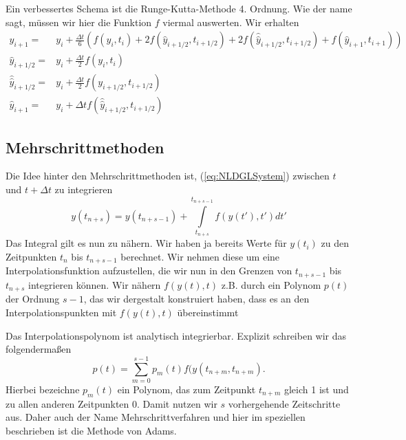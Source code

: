 Ein verbessertes Schema ist die Runge-Kutta-Methode 4. Ordnung. Wie der name
sagt, müssen wir hier die  Funktion $f$ viermal auswerten. Wir erhalten
\begin{align}\label{eq:RK4order}
  y_{i+1} =& y_{i}+\frac{\Delta t}{6}\left( 
    f(y_i,t_i)+2f(\hat{y}_{i+1/2},t_{i+1/2})+2f(\hat{\hat{y}}_{i+1/2},t_{i+1/2})
  +f(\hat{y}_{i+1},t_{i+1})\right)\\
  \hat{y}_{i+1/2}=&y_i+\frac{\Delta t}{2}f(y_{i},t_{i})\nonumber\\
  \hat{\hat{y}}_{i+1/2}=&y_i+\frac{\Delta t}{2}f(y_{i+1/2},t_{i+1/2})\nonumber\\
  \hat{y}_{i+1}=&y_i+\Delta tf(\hat{\hat{y}}_{i+1/2},t_{i+1/2})\nonumber
\end{align}

\subsection{Mehrschrittmethoden}
Die Idee hinter den Mehrschrittmethoden ist, (\ref{eq:NLDGLSystem}) zwischen
$t$ und $t+\Delta t$ zu integrieren
\begin{equation*}
y(t_{n+s})=y(t_{n+s-1})+\int\limits_{t_{n+s}}^{t_{n+s-1}}f(y(t'),t')dt'
\end{equation*}
Das Integral gilt es nun zu nähern. Wir haben ja bereits Werte für $y(t_i)$ zu
den Zeitpunkten $t_n$  bis $t_{n+s-1}$ berechnet. Wir nehmen  diese um eine
Interpolationsfunktion aufzustellen, die wir nun in den Grenzen von $t_{n+s-1}$
bis $t_{n+s}$ integrieren können. Wir nähern $f(y(t),t)$ z.B. durch ein
Polynom $p(t)$ der Ordnung $s-1$, das wir dergestalt konstruiert haben, dass es an
den Interpolationspunkten mit $f(y(t),t)$ übereinstimmt

Das Interpolationspolynom ist analytisch integrierbar.  Explizit schreiben wir
das folgendermaßen
\[ p(t)=\sum\limits_{m=0}^{s-1}p_m(t)f(y(t_{n+m},t_{n+m}). \]
Hierbei bezeichne $p_m(t)$ ein Polynom, das zum Zeitpunkt $t_{n+m}$ gleich 1
ist und zu allen anderen Zeitpunkten 0. Damit nutzen wir $s$ vorhergehende
Zeitschritte aus. Daher auch der Name Mehrschrittverfahren und hier im
speziellen beschrieben ist die Methode von Adams.
